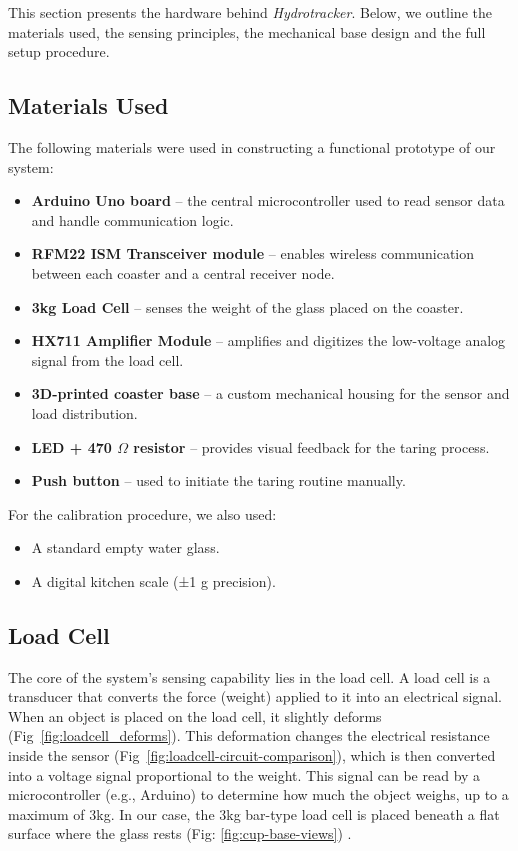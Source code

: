 This section presents the hardware behind \textit{Hydrotracker}.  Below, we outline the materials used, the sensing principles, the mechanical base design and the full setup procedure.

\subsection{Materials Used}
The following materials were used in constructing a functional prototype of our system:
\begin{itemize}
\item \textbf{Arduino Uno board} – the central microcontroller used to read sensor data and handle communication logic.
\item \textbf{RFM22 ISM Transceiver module} – enables wireless communication between each coaster and a central receiver node.
\item \textbf{3kg Load Cell} – senses the weight of the glass placed on the coaster.
\item \textbf{HX711 Amplifier Module} – amplifies and digitizes the low-voltage analog signal from the load cell.
\item \textbf{3D-printed coaster base} – a custom mechanical housing for the sensor and load distribution.
\item \textbf{LED + 470 $\Omega $ resistor} – provides visual feedback for the taring process.
\item \textbf{Push button} – used to initiate the taring routine manually.
\end{itemize}
For the calibration procedure, we also used:
\begin{itemize}
\item A standard empty water glass.
\item A digital kitchen scale (±1 g precision).
\end{itemize}

\subsection{Load Cell}
The core of the system’s sensing capability lies in the load cell. A load cell is a transducer that converts the force (weight) applied to it into an electrical signal. When an object is placed on the load cell, it slightly deforms (Fig~\ref{fig:loadcell_deforms}). This deformation changes the electrical resistance inside the sensor (Fig~\ref{fig:loadcell-circuit-comparison}), which is then converted into a voltage signal proportional to the weight. This signal can be read by a microcontroller (e.g., Arduino) to determine how much the object weighs, up to a maximum of 3kg. In our case, the 3kg bar-type load cell is placed beneath a flat surface where the glass rests (Fig: \ref{fig:cup-base-views}) .

